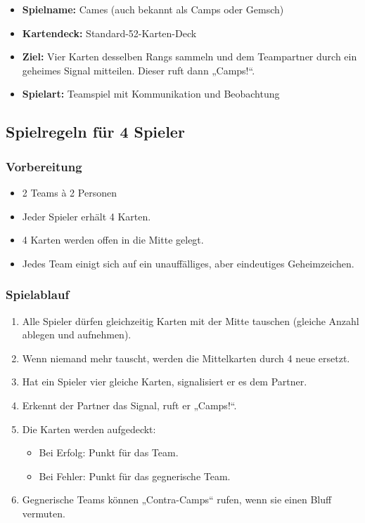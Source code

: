 \newpage


\begin{itemize}
    \item \textbf{Spielname:} Cames (auch bekannt als Camps oder Gemsch)
    \item \textbf{Kartendeck:} Standard-52-Karten-Deck
    \item \textbf{Ziel:} Vier Karten desselben Rangs sammeln und dem Teampartner durch ein geheimes Signal mitteilen. Dieser ruft dann „Camps!“.
    \item \textbf{Spielart:} Teamspiel mit Kommunikation und Beobachtung
\end{itemize}

\subsection*{Spielregeln für 4 Spieler}

\subsubsection*{Vorbereitung}

\begin{itemize}
    \item 2 Teams à 2 Personen
    \item Jeder Spieler erhält 4 Karten.
    \item 4 Karten werden offen in die Mitte gelegt.
    \item Jedes Team einigt sich auf ein unauffälliges, aber eindeutiges Geheimzeichen.
\end{itemize}

\subsubsection*{Spielablauf}

\begin{enumerate}
    \item Alle Spieler dürfen gleichzeitig Karten mit der Mitte tauschen (gleiche Anzahl ablegen und aufnehmen).
    \item Wenn niemand mehr tauscht, werden die Mittelkarten durch 4 neue ersetzt.
    \item Hat ein Spieler vier gleiche Karten, signalisiert er es dem Partner.
    \item Erkennt der Partner das Signal, ruft er „Camps!“.
    \item Die Karten werden aufgedeckt:
    \begin{itemize}
        \item Bei Erfolg: Punkt für das Team.
        \item Bei Fehler: Punkt für das gegnerische Team.
    \end{itemize}
    \item Gegnerische Teams können „Contra-Camps“ rufen, wenn sie einen Bluff vermuten.
\end{enumerate}

